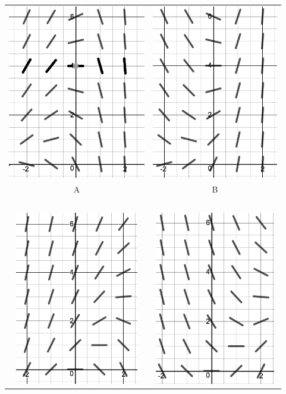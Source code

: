 \documentclass[addpoints,12pt]{exam}
\begin{document}
\begin{questions}
\begin{parts}
\begin{tabular}{c|c} \includegraphics[height=3in]{sf1} & 
 \includegraphics[height=3in]{sf2}\\
 A & B \\
 \hline
 ~\\
 \includegraphics[height=3in]{sf3}&
 \includegraphics[height=3in]{sf4}\\

\end{tabular}
\end{parts}
\end{questions}
\end{document}
